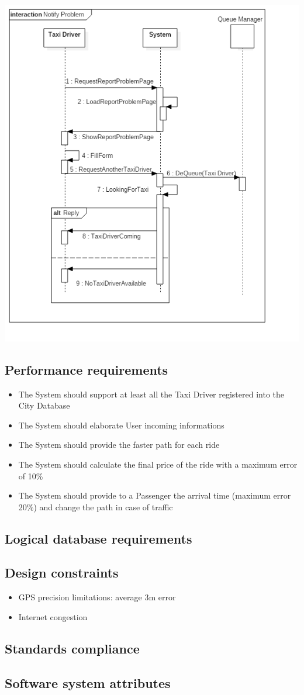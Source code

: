 \documentclass[english]{article}
\begin{document}
\includegraphics[width=\textwidth]{NotifyProblem}

\subsection{Performance requirements}
	\begin{itemize}
		\item The System should support at least all the Taxi Driver registered into the City Database
		\item The System should elaborate User incoming informations
		\item The System should provide the faster path for each ride
		\item The System should calculate the final price of the ride with a maximum error of 10\%
		\item The System should provide to a Passenger the arrival time (maximum error 20\%) and change the path in case of traffic
	\end{itemize}
	
\subsection{Logical database requirements}

\subsection{Design constraints}
	\begin{itemize}
		\item GPS precision limitations: average 3m error
		\item Internet congestion
	\end{itemize}

\subsection{Standards compliance}

\subsection{Software system attributes}
\end{document}
